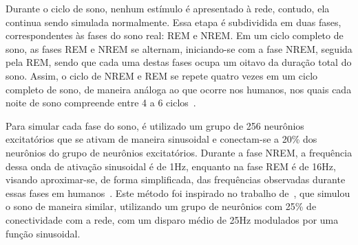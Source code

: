 Durante o ciclo de sono, nenhum estímulo é apresentado à rede, contudo, ela continua sendo simulada normalmente. Essa etapa é
subdividida em duas fases, correspondentes às fases do sono real: REM e NREM. Em um ciclo completo de sono, as fases REM e NREM se
alternam, iniciando-se com a fase NREM, seguida pela REM, sendo que cada uma destas fases ocupa um oitavo da duração total do
sono. Assim, o ciclo de NREM e REM se repete quatro vezes em um ciclo completo de sono, de maneira análoga ao que ocorre nos
humanos, nos quais cada noite de sono compreende entre 4 a 6 ciclos~\cite{patelPhysiology2023}.

Para simular cada fase do sono, é utilizado um grupo de 256 neurônios excitatórios que se ativam de maneira sinusoidal e
conectam-se a 20\% dos neurônios do grupo de neurônios excitatórios. Durante a fase NREM, a frequência dessa onda de ativação
sinusoidal é de 1Hz, enquanto na fase REM é de 16Hz, visando aproximar-se, de forma simplificada, das frequências observadas
durante essas fases em humanos~\cite{guoSlow2022, cowdinTheta2014}. Este método foi inspirado no trabalho de~, que
simulou o sono de maneira similar, utilizando um grupo de neurônios com 25\% de conectividade com a rede, com um disparo médio de
25Hz modulados por uma função sinusoidal.


